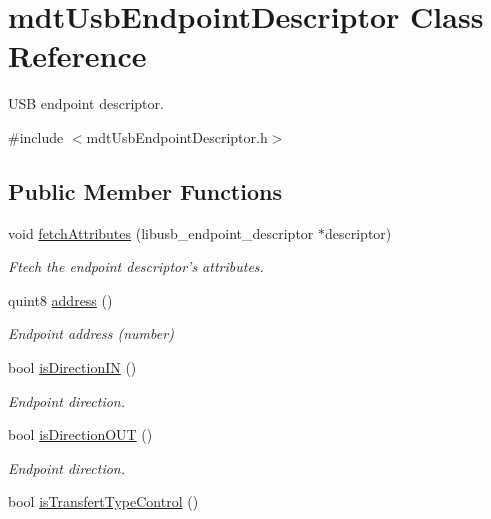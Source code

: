 \hypertarget{classmdt_usb_endpoint_descriptor}{
\section{mdtUsbEndpointDescriptor Class Reference}
\label{classmdt_usb_endpoint_descriptor}
}


USB endpoint descriptor.  




{\ttfamily \#include $<$mdtUsbEndpointDescriptor.h$>$}

\subsection*{Public Member Functions}
\begin{DoxyCompactItemize}
\item 
void \hyperlink{classmdt_usb_endpoint_descriptor_af001cef68ba1e177a63b1f9ba02ddc6c}{fetchAttributes} (libusb\_\-endpoint\_\-descriptor $\ast$descriptor)
\begin{DoxyCompactList}\small\item\em Ftech the endpoint descriptor's attributes. \end{DoxyCompactList}\item 
quint8 \hyperlink{classmdt_usb_endpoint_descriptor_a478bc4bdec482184c0fc9af3218afad9}{address} ()
\begin{DoxyCompactList}\small\item\em Endpoint address (number) \end{DoxyCompactList}\item 
\hypertarget{classmdt_usb_endpoint_descriptor_a8f6bc6b31b436f21c3ad34f909f35ccf}{
bool \hyperlink{classmdt_usb_endpoint_descriptor_a8f6bc6b31b436f21c3ad34f909f35ccf}{isDirectionIN} ()}
\label{classmdt_usb_endpoint_descriptor_a8f6bc6b31b436f21c3ad34f909f35ccf}

\begin{DoxyCompactList}\small\item\em Endpoint direction. \end{DoxyCompactList}\item 
\hypertarget{classmdt_usb_endpoint_descriptor_ae45b2407d6f973c25ff0058eb941857a}{
bool \hyperlink{classmdt_usb_endpoint_descriptor_ae45b2407d6f973c25ff0058eb941857a}{isDirectionOUT} ()}
\label{classmdt_usb_endpoint_descriptor_ae45b2407d6f973c25ff0058eb941857a}

\begin{DoxyCompactList}\small\item\em Endpoint direction. \end{DoxyCompactList}\item 
\hypertarget{classmdt_usb_endpoint_descriptor_a98313de5a27b8d9f21dd626a03fa9d3f}{
bool \hyperlink{classmdt_usb_endpoint_descriptor_a98313de5a27b8d9f21dd626a03fa9d3f}{isTransfertTypeControl} ()}
\label{classmdt_usb_endpoint_descriptor_a98313de5a27b8d9f21dd626a03fa9d3f}


\end{DoxyCompactItemize}
